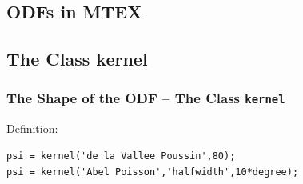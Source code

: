 \subsection*{ODFs in MTEX}


\subsection*{The Class kernel}


\begin{frame}[fragile]
  \frametitle{The Shape of the ODF -- The \MTEX Class \texttt{\bf kernel}}

Definition:

\begin{lstlisting}
psi = kernel('de la Vallee Poussin',80);
psi = kernel('Abel Poisson','halfwidth',10*degree);
\end{lstlisting}

\medskip


\end{frame}
